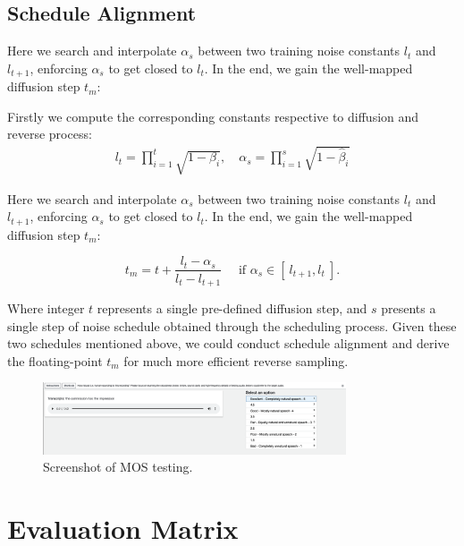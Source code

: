 \subsection{Schedule Alignment}  \label{appendix:schedule_alignment}
Here we search and interpolate $\alpha_{s}$ between two training noise constants $l_{t}$ and $l_{t+1}$, enforcing $\alpha_{s}$ to get closed to $l_{t}$. In the end, we gain the well-mapped diffusion step $t_m$:

Firstly we compute the corresponding constants respective to diffusion and reverse process:
\begin{align}
    l_{t}=\prod_{i=1}^{t} \sqrt{1-\beta_{i}}, \quad \alpha_{s}=\prod_{i=1}^{s} \sqrt{1-\hat{\beta}_{i}}
\end{align}

Here we search and interpolate $\alpha_{s}$ between two training noise constants $l_{t}$ and $l_{t+1}$, enforcing $\alpha_{s}$ to get closed to $l_{t}$. In the end, we gain the well-mapped diffusion step $t_m$:

\begin{equation}\label{eq: aligned step}
    t_m = t + \frac{l_t-\alpha_s}{l_t-l_{t+1}} \quad \text{ if } \alpha_s\in[\ l_{t+1}, l_t\ ].
\end{equation}

Where integer $t$ represents a single pre-defined diffusion step, and $s$ presents a single step of noise schedule obtained through the scheduling process. Given these two schedules mentioned above, we could conduct schedule alignment and derive the floating-point $t_m$ for much more efficient reverse sampling.


\begin{figure}
    \vspace{-2mm}
    \centering
    \includegraphics[width=0.8\textwidth]{Figures/mos_test.png}
    \vspace{-1mm}
   \caption{Screenshot of MOS testing.} 
    \label{fig:MOS}
  \end{figure}
\section{Evaluation Matrix} \label{appendix:evaluation}


